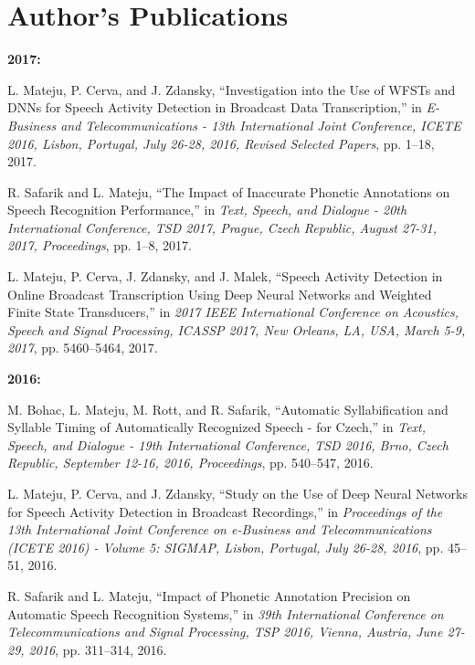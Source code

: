 \documentclass[FM,noheader,EN]{tulthesis}
\begin{document}



\newpage
\chapter*{Author's Publications}
	
	\textbf{2017:}
	\begin{enumerate}[leftmargin=*]
		L. Mateju, P. Cerva, and J. Zdansky, “Investigation into the Use of WFSTs and DNNs for 
		Speech Activity Detection in Broadcast Data Transcription,” in \textit{E-Business and
		Telecommunications - 13th International Joint Conference, ICETE 2016, Lisbon,
		Portugal, July 26-28, 2016, Revised Selected Papers}, pp. 1–18, 2017.
	
		R. Safarik and L. Mateju, “The Impact of Inaccurate Phonetic Annotations 
		on Speech Recognition Performance,” in \textit{Text, Speech, and Dialogue - 20th 
		International Conference, TSD 2017, Prague, Czech Republic, August 27-31, 2017, 
		Proceedings}, pp. 1–8, 2017.
	
		L. Mateju, P. Cerva, J. Zdansky, and J. Malek, “Speech Activity Detection in 
		Online Broadcast Transcription Using Deep Neural Networks and Weighted Finite
		State Transducers,” in \textit{2017 IEEE International Conference on Acoustics, Speech 
		and Signal Processing, ICASSP 2017, New Orleans, LA, USA, March 5-9, 2017}, 
		pp. 5460–5464, 2017.
	\end{enumerate}
	
	\noindent \textbf{2016:}
	\begin{enumerate}[leftmargin=*,resume]
		M. Bohac, L. Mateju, M. Rott, and R. Safarik, “Automatic Syllabification and 
		Syllable Timing of Automatically Recognized Speech - for Czech,” in \textit{Text, Speech, 
		and Dialogue - 19th International Conference, TSD 2016, Brno, Czech Republic, 
		September 12-16, 2016, Proceedings}, pp. 540–547, 2016.
	
		L. Mateju, P. Cerva, and J. Zdansky, “Study on the Use of Deep Neural Networks 
		for Speech Activity Detection in Broadcast Recordings,” in \textit{Proceedings of the 13th 
		International Joint Conference on e-Business and Telecommunications (ICETE 
		2016) - Volume 5: SIGMAP, Lisbon, Portugal, July 26-28, 2016}, pp. 45–51, 
		2016.
		
		R. Safarik and L. Mateju, “Impact of Phonetic Annotation Precision on Automatic 
		Speech Recognition Systems,” in \textit{39th International Conference on 
		Telecommunications and Signal Processing, TSP 2016, Vienna, Austria, June 27-29, 2016}, 
		pp. 311–314, 2016.
	\end{enumerate}
	
\end{document}
